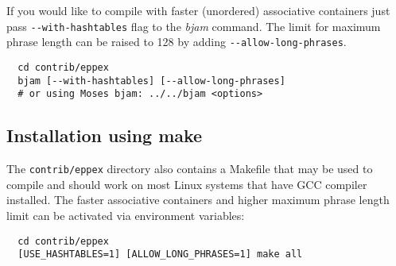 If you would like to compile \eppex{} with faster (unordered) associative containers
just pass \verb|--with-hashtables| flag to the \emph{bjam} command.
The limit for maximum phrase length can be raised to 128 by adding
\verb|--allow-long-phrases|.
\begin{verbatim}
  cd contrib/eppex
  bjam [--with-hashtables] [--allow-long-phrases]
  # or using Moses bjam: ../../bjam <options>
\end{verbatim}

\subsection*{Installation using make}
The \texttt{contrib/eppex} directory also contains a Makefile that may be used to compile
\eppex{} and should work on most Linux systems that have GCC compiler installed.
The faster associative containers and higher maximum phrase length limit can be activated
via environment variables:
\begin{verbatim}
  cd contrib/eppex
  [USE_HASHTABLES=1] [ALLOW_LONG_PHRASES=1] make all
\end{verbatim}
